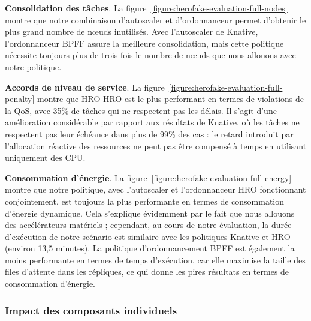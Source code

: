 \textbf{Consolidation des tâches}. La figure~\ref{figure:herofake-evaluation-full-nodes} montre que notre combinaison d'autoscaler et d'ordonnanceur permet d'obtenir le plus grand nombre de nœuds inutilisés. Avec l'autoscaler de Knative, l'ordonnanceur BPFF assure la meilleure consolidation, mais cette politique nécessite toujours plus de trois fois le nombre de nœuds que nous allouons avec notre politique.

\textbf{Accords de niveau de service}. La figure~\ref{figure:herofake-evaluation-full-penalty} montre que HRO-HRO est le plus performant en termes de violations de la \gls{QoS}, avec 35\% de tâches qui ne respectent pas les délais. Il s'agit d'une amélioration considérable par rapport aux résultats de Knative, où les tâches ne respectent pas leur échéance dans plus de 99\% des cas : le retard introduit par l'allocation réactive des ressources ne peut pas être compensé à temps en utilisant uniquement des \gls{CPU}.

\textbf{Consommation d'énergie}. La figure~\ref{figure:herofake-evaluation-full-energy} montre que notre politique, avec l'autoscaler et l'ordonnanceur HRO fonctionnant conjointement, est toujours la plus performante en termes de consommation d'énergie dynamique. Cela s'explique évidemment par le fait que nous allouons des accélérateurs matériels ; cependant, au cours de notre évaluation, la durée d'exécution de notre scénario est similaire avec les politiques Knative et HRO (environ 13,5 minutes). La politique d'ordonnancement BPFF est également la moins performante en termes de temps d'exécution, car elle maximise la taille des files d'attente dans les répliques, ce qui donne les pires résultats en termes de consommation d'énergie.

\subsubsection{Impact des composants individuels}

